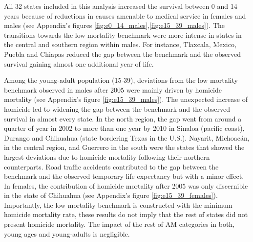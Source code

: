 \documentclass[11.5pt]{article}
\begin{document}
\begin{spacing}{1.5}
All 32 states included in this analysis increased the survival between 0 and 14 years because of reductions in causes amenable to medical service in females and males (see Appendix's figures  \ref{fig:e0_14_males},\ref{fig:e15_39_males}). The transitions towards the low mortality benchmark were more intense in states in the central and southern region within males. For instance, Tlaxcala, Mexico, Puebla and Chiapas reduced the gap between the benchmark and the observed survival gaining almost one additional year of life. 

Among the young-adult population (15-39), deviations from the low mortality benchmark observed in males after 2005 were mainly driven by homicide mortality (see Appendix's figure \ref{fig:e15_39_males}). The unexpected increase of homicide led to widening the gap between the benchmark and the observed survival in almost every state. In the north region, the gap went from around a quarter of year in 2002 to more than one year by 2010 in Sinaloa (pacific coast), Durango and Chihuahua (state bordering Texas in the U.S.). Nayarit, Michoac\'an, in the central region, and Guerrero in the south were the states that showed the largest deviations due to homicide mortality following their northern counterparts. Road traffic accidents contributed to the gap between the benchmark and the observed temporary life expectancy but with a minor effect. In females, the contribution of homicide mortality after 2005 was only discernible in the state of Chihuahua (see Appendix's figure \ref{fig:e15_39_females}). Importantly, the low mortality benchmark is constructed with the minimum homicide mortality rate, these results do not imply that the rest of states did not present homicide mortality. The impact of the rest of AM categories in both, young ages and young-adults is negligible. 






\end{spacing}
\end{document}
